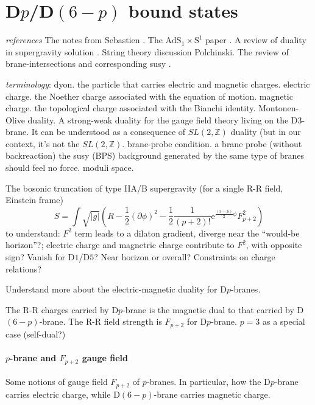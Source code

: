 
\section{D$p$/D$(6-p)$ bound states}

\begin{info}
	\emph{references} The notes from Sebastien .
	The $\mathrm{AdS}_1 \times \mathrm{S}^1$ paper .
	A review of duality in supergravity solution .
	String theory discussion Polchinski.
	The review of brane-intersections and corresponding susy .
\end{info}

\begin{info}
	\emph{terminology}: dyon. the particle that carries electric and magnetic charges.
	electric charge. the Noether charge associated with the equation of motion.
	magnetic charge. the topological charge associated with the Bianchi identity.
	Montonen-Olive duality. A strong-weak duality for the gauge field theory living on the D$3$-brane.
	It can be understood as a consequence of $SL(2,\mathbb{Z})$ duality (but in our context, it's not the $SL(2,\mathbb{Z})$.
	brane-probe condition. a brane probe (without backreaction) the susy (BPS) background generated by the same type of branes should feel no force.
	moduli space. 
\end{info}

The bosonic truncation of type IIA/B supergravity (for a single R-R field, Einstein frame)
\begin{equation}
S = \int \sqrt{|g|} \left( R - \frac{1}{2} (\partial\phi)^2 - \frac{1}{2} \frac{1}{(p+2)!} \mathrm{e}^{\frac{(3-p)}{2}\phi} F_{p+2}^2 \right)
\end{equation}
to understand: $F^2$ term leads to a dilaton gradient,
diverge near the ``would-be horizon''?;
electric charge and magnetric charge contribute to $F^2$,
with opposite sign?
Vanish for D$1$/D$5$? Near horizon or overall? Constraints on charge relations?

Understand more about the electric-magnetic duality for D$p$-branes.

The R-R charges carried by D$p$-brane is the magnetic dual to that carried by D$(6-p)$-brane.
The R-R field strength is $F_{p+2}$ for D$p$-brane.
$p=3$ as a special case (self-dual?)

\paragraph{$p$-brane and $F_{p+2}$ gauge field}
Some notions of gauge field $F_{p+2}$ of $p$-branes.
In particular, how the D$p$-brane carries electric charge, while D$(6-p)$-brane carries magnetic charge.

